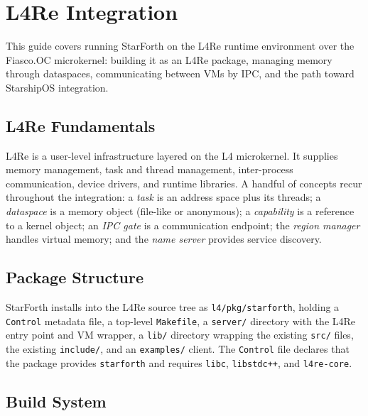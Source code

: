 
\section{L4Re Integration}

This guide covers running StarForth on the L4Re runtime environment over the
Fiasco.OC microkernel: building it as an L4Re package, managing memory through
dataspaces, communicating between VMs by IPC, and the path toward StarshipOS
integration.

\subsection{L4Re Fundamentals}

L4Re is a user-level infrastructure layered on the L4 microkernel. It supplies
memory management, task and thread management, inter-process communication,
device drivers, and runtime libraries. A handful of concepts recur throughout
the integration: a \emph{task} is an address space plus its threads; a
\emph{dataspace} is a memory object (file-like or anonymous); a
\emph{capability} is a reference to a kernel object; an \emph{IPC gate} is a
communication endpoint; the \emph{region manager} handles virtual memory; and
the \emph{name server} provides service discovery.

\subsection{Package Structure}

StarForth installs into the L4Re source tree as \texttt{l4/pkg/starforth},
holding a \texttt{Control} metadata file, a top-level \texttt{Makefile}, a
\texttt{server/} directory with the L4Re entry point and VM wrapper, a
\texttt{lib/} directory wrapping the existing \texttt{src/} files, the existing
\texttt{include/}, and an \texttt{examples/} client. The \texttt{Control} file
declares that the package provides \texttt{starforth} and requires
\texttt{libc}, \texttt{libstdc++}, and \texttt{l4re-core}.

\subsection{Build System}

